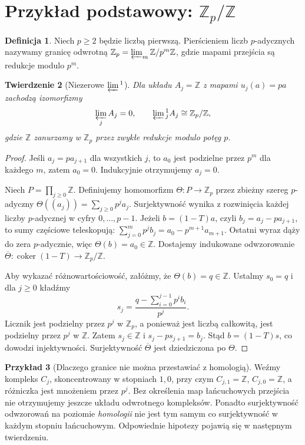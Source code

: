 \documentclass[11pt,a4paper,oneside]{report}
\newcommand{\Z}{\mathbb{Z}}
\theoremstyle{plain}
\newtheorem{twierdzenie}{Twierdzenie}[section]
\theoremstyle{definition}
\newtheorem{definicja}[twierdzenie]{Definicja}
\newtheorem{przyklad}[twierdzenie]{Przykład}
\theoremstyle{remark}
\begin{document}
\section{Przykład podstawowy: $\mathbb Z_p/\mathbb Z$}
\begin{definicja}
Niech $p\ge2$ będzie liczbą pierwszą. Pierścieniem liczb
$p$-adycznych nazywamy granicę odwrotną
$\mathbb Z_p=\varprojlim_m\mathbb Z/p^m\mathbb Z$,
gdzie mapami przejścia są redukcje modulo $p^m$.
\end{definicja}
\begin{twierdzenie}[Niezerowe $\varprojlim{}^1$]
\label{thm:xviii-padic}
Dla układu $A_j=\Z$ z mapami $u_j(a)=pa$ zachodzą
izomorfizmy
\[
\varprojlim_j A_j=0,\qquad
\varprojlim{}^1_j A_j\cong\Z_p/\Z,
\]
gdzie $\Z$ zanurzamy w $\Z_p$ przez zwykłe redukcje
modulo potęg $p$.
\end{twierdzenie}
\begin{proof}
Jeśli $a_j=pa_{j+1}$ dla wszystkich $j$, to $a_0$
jest podzielne przez $p^m$ dla każdego $m$, zatem $a_0=0$.
Indukcyjnie otrzymujemy $a_j=0$.

Niech $P=\prod_{j\ge0}\Z$. Definiujemy homomorfizm
$\Theta:P\to\Z_p$ przez zbieżny szereg $p$-adyczny
$\Theta((a_j))=\sum_{j\ge0}p^ja_j$.
Surjektywność wynika z rozwinięcia każdej liczby $p$-adycznej
w cyfry $0,\ldots,p-1$.
Jeżeli $b=(1-T)a$, czyli $b_j=a_j-pa_{j+1}$,
to sumy częściowe teleskopują:
$\sum_{j=0}^{m}p^jb_j=a_0-p^{m+1}a_{m+1}$.
Ostatni wyraz dąży do zera $p$-adycznie, więc
$\Theta(b)=a_0\in\Z$. Dostajemy indukowane odwzorowanie
$\overline\Theta:\operatorname{coker}(1-T)\to\Z_p/\Z$.

Aby wykazać różnowartościowość, załóżmy, że
$\Theta(b)=q\in\Z$. Ustalmy $s_0=q$ i dla $j\ge0$ kładźmy
\[
s_j=\frac{q-\sum_{i=0}^{j-1}p^ib_i}{p^j}.
\]
Licznik jest podzielny przez $p^j$ w $\Z_p$, a ponieważ
jest liczbą całkowitą, jest podzielny przez $p^j$ w $\Z$.
Zatem $s_j\in\Z$ i $s_j-ps_{j+1}=b_j$.
Stąd $b=(1-T)s$, co dowodzi injektywności.
Surjektywność $\overline\Theta$ jest dziedziczona po $\Theta$.
\end{proof}
\begin{przyklad}[Dlaczego granice nie można przestawiać z homologią]
Weźmy kompleks $C_j$, skoncentrowany w stopniach $1,0$,
przy czym $C_{j,1}=\Z$, $C_{j,0}=\Z$, a różniczka jest mnożeniem
przez $p^j$. Bez określenia map łańcuchowych przejścia nie
otrzymujemy jeszcze układu odwrotnego kompleksów. Ponadto
surjektywność odwzorowań na poziomie \emph{homologii} nie jest tym
samym co surjektywność w każdym stopniu łańcuchowym.
Odpowiednie hipotezy pojawią się w następnym twierdzeniu.
\end{przyklad}
\end{document}
